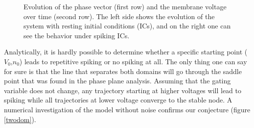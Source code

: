 \documentclass[12pt,a4paper]{article}
\begin{document}
\begin{figure}[H]
	\caption{Evolution of the phase vector (first row) and the membrane voltage over time (second row).
		The left side shows the evolution of the system with resting initial conditions (ICs), and on the right one can see the behavior under spiking ICs.}
	\label{subfig} 
\end{figure}
Analytically, it is hardly possible to determine whether a specific starting point ($V_0$,$n_0$) leads to repetitive spiking or no spiking at all. The only thing one can say for sure is that the line that separates both domains will go through the saddle point that was found in the phase plane analysis. Assuming that the gating variable does not change, any trajectory starting at higher voltages will lead to spiking while all trajectories at lower voltage converge to the stable node. A numerical investigation of the model without noise confirms our conjecture (figure \ref{twodom}).
\end{document}
